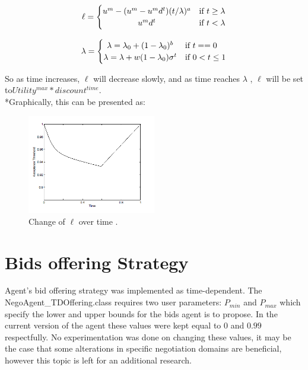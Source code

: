 \documentclass[html]{report}    %
\begin{document}
\[
  \ell = \left\{\def\arraystretch{1.2}%
  \begin{array}{@{}c@{\quad}l@{}}
    u^m -(u^m-	u^md^t)(t/\lambda)^a  & \mbox{if } t \geq \lambda \\
   	u^m d^t & \mbox{if } t < \lambda
  \end{array}\right.
\]

\[
  \lambda = \left\{\def\arraystretch{1.2}%
  \begin{array}{@{}c@{\quad}l@{}}
    \lambda = \lambda_0 + (1-\lambda_0)^b &  \mbox{if } t==0\\
    \lambda = \lambda + w(1-\lambda_0)\sigma^t & \mbox{if } 0<t\leq1\\
  \end{array}\right.
\]

So as time increases, $\ell$ will decrease slowly, and as time reaches $\lambda$ , $\ell$ will be set to\( Utility^{max} * discount^{time}  \).
\\*Graphically, this can be presented as:


	\begin{figure}[h!]
	  \caption{Change of $\ell$ over time .}
	  \centering
	    \includegraphics[width=0.5\textwidth]{ell}
	\end{figure}

\section{Bids offering Strategy}

Agent's bid offering strategy was implemented as time-dependent. The NegoAgent\_TDOffering.class requires two user parameters: $P_{min}$ and $P_{max}$ which specify the lower and upper bounds for the bids agent is to propose. In the current version of the agent these values were kept equal to $0$ and $0.99$ respectfully. No experimentation was done on changing these values, it may be the case that some alterations in specific negotiation domains are beneficial, however this topic is left for an additional research.
\end{document}
